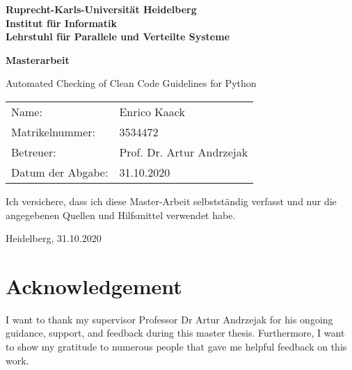 \documentclass[
     12pt,                    %
     a4paper,             %
     BCOR10mm,     %
     DIV14,                 %
     listof=totoc,                    %
     bibliography=totoc,       %
     index=totoc,              %
     twoside,
     headsepline
     ]{scrreprt}
\begin{document}
\begin{titlepage}


\vspace*{1cm}
\begin{center}
\vspace*{3cm}
\textbf{ 
\Large Ruprecht-Karls-Universität Heidelberg\\
\smallskip
\Large Institut für Informatik\\
\smallskip
\Large Lehrstuhl für Parallele und Verteilte Systeme\\
\smallskip
}

\vspace{3cm}

\textbf{\large Masterarbeit} 

\vspace{0.5\baselineskip}
{\huge
Automated Checking of Clean Code Guidelines for Python
}
\end{center}

\vfill 

{\large
\begin{tabular}[l]{ll}
Name: & Enrico Kaack\\
Matrikelnummer: & 3534472\\
Betreuer: & Prof. Dr. Artur Andrzejak\\
Datum der Abgabe: & 31.10.2020
\end{tabular}
}

\end{titlepage}

\onehalfspacing

\thispagestyle{empty}

\vspace*{100pt}
\noindent
Ich versichere, dass ich diese Master-Arbeit selbstständig verfasst und nur die angegebenen
Quellen und Hilfsmittel verwendet habe.

\vspace*{50pt}

\noindent
Heidelberg, 31.10.2020
\cleardoublepage






\newpage
\section*{Acknowledgement}
I want to thank my supervisor Professor Dr Artur Andrzejak for his ongoing guidance, support, and feedback during this master thesis.
Furthermore, I want to show my gratitude to numerous people that gave me helpful feedback on this work.
\end{document}
